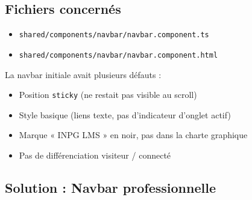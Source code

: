 \documentclass[a4paper,12pt,french]{article}
\begin{document}
\subsection{Fichiers concernés}
\begin{itemize}
    \item \texttt{shared/components/navbar/navbar.component.ts}
    \item \texttt{shared/components/navbar/navbar.component.html}
\end{itemize}

\begin{problembox}
La navbar initiale avait plusieurs défauts :
\begin{itemize}
    \item Position \texttt{sticky} (ne restait pas visible au scroll)
    \item Style basique (liens texte, pas d'indicateur d'onglet actif)
    \item Marque « INPG LMS » en noir, pas dans la charte graphique
    \item Pas de différenciation visiteur / connecté
\end{itemize}
\end{problembox}

\subsection{Solution : Navbar professionnelle}
\end{document}
